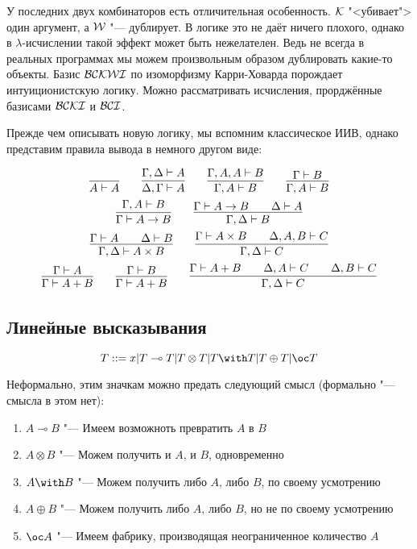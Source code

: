 У последних двух комбинаторов есть отличительная особенность. $\operatorname{\mathcal{K}}$ "<убивает"> один аргумент, а $\operatorname{\mathcal{W}}$ "--- дублирует.
В логике это не даёт ничего плохого, однако в $\lambda$-исчислении такой эффект может быть нежелателен.
Ведь не всегда в реальных программах мы можем произвольным образом дублировать какие-то объекты.
Базис $\operatorname{\mathcal{BCKWI}}$ по изоморфизму Карри-Ховарда порождает интуиционистскую логику.
Можно рассматривать исчисления, прорджённые базисами $\operatorname{\mathcal{BCKI}}$ и $\operatorname{\mathcal{BCI}}$.

Прежде чем описывать новую логику, мы вспомним классическое ИИВ, однако представим правила вывода в немного другом виде:
\begin{@empty} \inferspacing
\begin{gather*}
    \infer{A \vdash A}{} \qquad
    \infer{\Delta, \Gamma \vdash A}{\Gamma, \Delta \vdash A} \qquad
    \infer{\Gamma, A \vdash B}{\Gamma, A, A \vdash B} \qquad
    \infer{\Gamma, A \vdash B}{\Gamma \vdash B} \\
    \infer{\Gamma \vdash A \to B}{\Gamma, A \vdash B} \qquad
    \infer{\Gamma, \Delta \vdash B}{\Gamma \vdash A \to B && \Delta \vdash A} \\
    \infer{\Gamma, \Delta \vdash A \times B}{\Gamma \vdash A && \Delta \vdash B} \qquad
    \infer{\Gamma, \Delta \vdash C}{\Gamma \vdash A \times B && \Delta, A, B \vdash C}\\
    \infer{\Gamma \vdash A + B}{\Gamma \vdash A} \qquad
    \infer{\Gamma \vdash A + B}{\Gamma \vdash B} \qquad
    \infer{\Gamma, \Delta \vdash C}{\Gamma \vdash A + B && \Delta, A \vdash C && \Delta, B \vdash C}
\end{gather*}
\end{@empty}%

\subsection{\texorpdfstring{Линейные высказывания}{Linear statements}}
\begin{definition}
    \begin{bnf}
    \[
        T ::= x | T \multimap T | T \otimes T | T \with T | T \oplus T | \oc T
    \]
    \end{bnf}
\end{definition}
Неформально, этим значкам можно предать следующий смысл (формально "--- смысла в этом нет):
\begin{enumerate}
	\item $A \multimap B$  "--- Имеем возможноть превратить $A$ в $B$
	\item $A \otimes B$ "--- Можем получить и $A$, и $B$, одновременно
	\item $A \with B$ "--- Можем получить либо $A$, либо $B$, по своему усмотрению
	\item $A \oplus B$ "--- Можем получить либо $A$, либо $B$, но не по своему усмотрению
	\item $\oc A$ "--- Имеем фабрику, производящая  неограниченное количество $A$
\end{enumerate}


